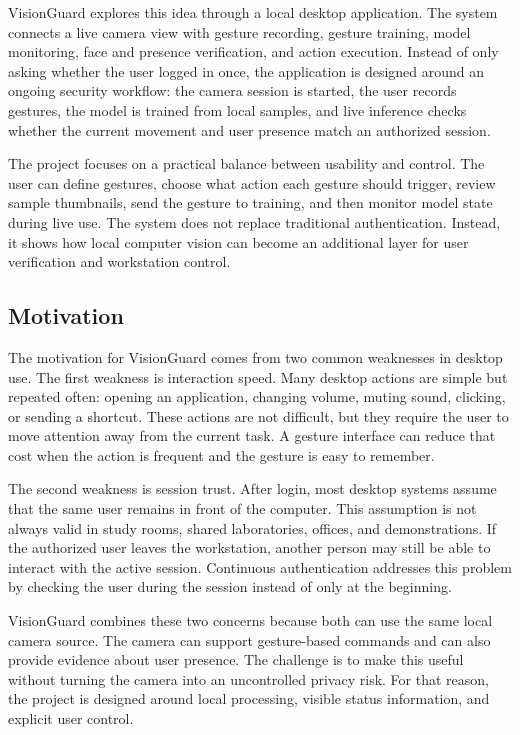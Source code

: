 \documentclass[10pt,twocolumn]{article}
\begin{document}
VisionGuard explores this idea through a local desktop application.
The system connects a live camera view with gesture recording, gesture training, model monitoring, face and presence verification, and action execution.
Instead of only asking whether the user logged in once, the application is designed around an ongoing security workflow: the camera session is started, the user records gestures, the model is trained from local samples, and live inference checks whether the current movement and user presence match an authorized session.

The project focuses on a practical balance between usability and control.
The user can define gestures, choose what action each gesture should trigger, review sample thumbnails, send the gesture to training, and then monitor model state during live use.
The system does not replace traditional authentication.
Instead, it shows how local computer vision can become an additional layer for user verification and workstation control.

\subsection{Motivation}
The motivation for VisionGuard comes from two common weaknesses in desktop use.
The first weakness is interaction speed.
Many desktop actions are simple but repeated often: opening an application, changing volume, muting sound, clicking, or sending a shortcut.
These actions are not difficult, but they require the user to move attention away from the current task.
A gesture interface can reduce that cost when the action is frequent and the gesture is easy to remember.

The second weakness is session trust.
After login, most desktop systems assume that the same user remains in front of the computer.
This assumption is not always valid in study rooms, shared laboratories, offices, and demonstrations.
If the authorized user leaves the workstation, another person may still be able to interact with the active session.
Continuous authentication addresses this problem by checking the user during the session instead of only at the beginning.

VisionGuard combines these two concerns because both can use the same local camera source.
The camera can support gesture-based commands and can also provide evidence about user presence.
The challenge is to make this useful without turning the camera into an uncontrolled privacy risk.
For that reason, the project is designed around local processing, visible status information, and explicit user control.
\end{document}
